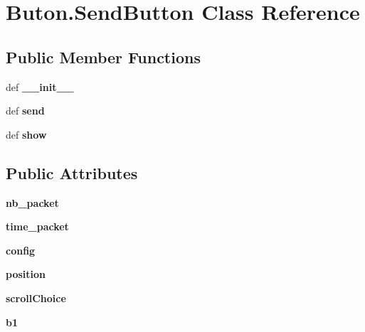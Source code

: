 \hypertarget{classButon_1_1SendButton}{\section{Buton.\+Send\+Button Class Reference}
\label{classButon_1_1SendButton}
}
\subsection*{Public Member Functions}
\begin{DoxyCompactItemize}
\item 
\hypertarget{classButon_1_1SendButton_aa12b6257598cbc8304a993fbcf0d85ec}{def {\bfseries \+\_\+\+\_\+init\+\_\+\+\_\+}}\label{classButon_1_1SendButton_aa12b6257598cbc8304a993fbcf0d85ec}

\item 
\hypertarget{classButon_1_1SendButton_ac35254e6f2349696284a95a28082897c}{def {\bfseries send}}\label{classButon_1_1SendButton_ac35254e6f2349696284a95a28082897c}

\item 
\hypertarget{classButon_1_1SendButton_a0f5cea8750fe292811dc28bbeb87b24b}{def {\bfseries show}}\label{classButon_1_1SendButton_a0f5cea8750fe292811dc28bbeb87b24b}

\end{DoxyCompactItemize}
\subsection*{Public Attributes}
\begin{DoxyCompactItemize}
\item 
\hypertarget{classButon_1_1SendButton_a7bc6a511ddbcf41ccbed4ac614ba0468}{{\bfseries nb\+\_\+packet}}\label{classButon_1_1SendButton_a7bc6a511ddbcf41ccbed4ac614ba0468}

\item 
\hypertarget{classButon_1_1SendButton_a3bd82e242aaecbf324ef942df421fc44}{{\bfseries time\+\_\+packet}}\label{classButon_1_1SendButton_a3bd82e242aaecbf324ef942df421fc44}

\item 
\hypertarget{classButon_1_1SendButton_a2656c3901a73a4cb5c18fce1bd21b084}{{\bfseries config}}\label{classButon_1_1SendButton_a2656c3901a73a4cb5c18fce1bd21b084}

\item 
\hypertarget{classButon_1_1SendButton_aac10ab96693715e0d580b06317c0fd73}{{\bfseries position}}\label{classButon_1_1SendButton_aac10ab96693715e0d580b06317c0fd73}

\item 
\hypertarget{classButon_1_1SendButton_a40b300924f62fb795bb73f228f2bdb24}{{\bfseries scroll\+Choice}}\label{classButon_1_1SendButton_a40b300924f62fb795bb73f228f2bdb24}

\item 
\hypertarget{classButon_1_1SendButton_afda17ea3319bda160d36bab86e9d35b0}{{\bfseries b1}}\label{classButon_1_1SendButton_afda17ea3319bda160d36bab86e9d35b0}

\end{DoxyCompactItemize}



